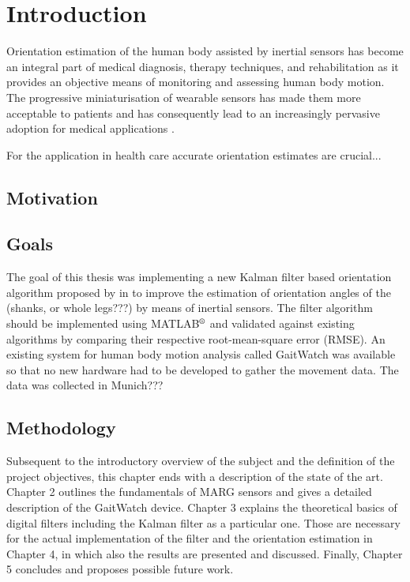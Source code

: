 \chapter{Introduction}
\label{ch:Introduction}

Orientation estimation of the human body assisted by inertial sensors has become an integral part of medical diagnosis, therapy techniques, and rehabilitation as it provides an objective means of monitoring and assessing human body motion. The progressive miniaturisation of wearable sensors has made them more acceptable to patients and has consequently lead to an increasingly pervasive adoption for medical applications \cite{wee_soon_ambulatory_2008}.

For the application in health care accurate orientation estimates are crucial...

\section{Motivation}


\section{Goals}

The goal of this thesis was implementing a new Kalman filter based orientation algorithm proposed by \citeauthor{bennett_motion_2014} in \cite{bennett_motion_2014} to improve the estimation of orientation angles of the (shanks, or whole legs???) by means of inertial sensors. The filter algorithm should be implemented using MATLAB$\textsuperscript{\textregistered}$ and validated against existing algorithms by comparing their respective root-mean-square error (RMSE). An existing system for human body motion analysis called GaitWatch was available so that no new hardware had to be developed to gather the movement data. The data was collected in Munich???

\section{Methodology}

Subsequent to the introductory overview of the subject and the definition of the project objectives, this chapter ends with a description of the state of the art. Chapter 2 outlines the fundamentals of MARG sensors and gives a detailed description of the GaitWatch device. Chapter 3 explains the theoretical basics of digital filters including the Kalman filter as a particular one. Those are necessary for the actual implementation of the filter and the orientation estimation in Chapter 4, in which also the results are presented and discussed. Finally, Chapter 5 concludes and proposes possible future work.

